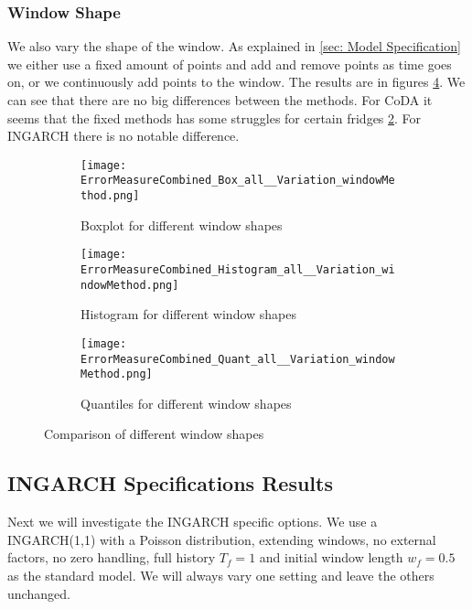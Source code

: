 \subsubsection{Window Shape}
\label{sec:Window Shape}

We also vary the shape of the window. As explained in \ref{sec: Model Specification} we either use a fixed amount of points and add and remove points as time goes on, or we continuously add points to the window. The results are in figures \ref{fig:window methods Comp1}. We can see that there are no big differences between the methods. For CoDA it seems that the fixed methods has some struggles for certain fridges \ref{fig:window methods Hist}. For INGARCH there is no notable difference. 

\begin{figure}[htb!]
\centering
\begin{subfigure}[b]{0.45\textwidth}
\texttt{[image: ErrorMeasureCombined\_Box\_all\_\_Variation\_windowMethod.png]}
\caption{Boxplot for different window shapes}
\label{fig:window methods Box}
\end{subfigure}
\hfill
\begin{subfigure}[b]{0.45\textwidth}
\texttt{[image: ErrorMeasureCombined\_Histogram\_all\_\_Variation\_windowMethod.png]}
\caption{Histogram for different window shapes}
\label{fig:window methods Hist}
\end{subfigure}
\hfill
\begin{subfigure}[b]{0.8\textwidth}
\texttt{[image: ErrorMeasureCombined\_Quant\_all\_\_Variation\_windowMethod.png]}
\caption{Quantiles for different window shapes}
\label{fig:window methods Quant}
\end{subfigure}
\caption{Comparison of different window shapes}
\label{fig:window methods Comp1}
\end{figure}


\subsection{INGARCH Specifications Results}
\label{sec: Ingarch Specifications Results}

Next we will investigate the INGARCH specific options. We use a INGARCH(1,1) with a Poisson distribution, extending windows, no external factors, no zero handling, full history $T_f=1$ and initial window length $w_f=0.5$ as the standard model. We will always vary one setting and leave the others unchanged. 

